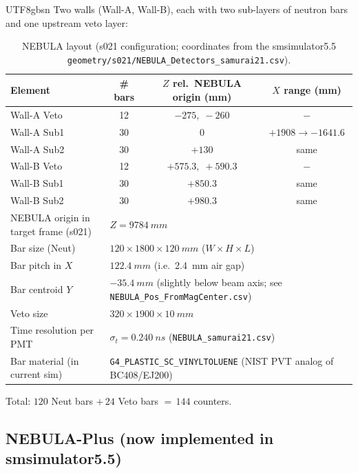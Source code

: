 \documentclass[11pt,a4paper]{article}
\newcommand{\NEB}{NEBULA}
\newcommand{\NPL}{NEBULA-Plus}
\begin{document}
\begin{CJK}{UTF8}{gbsn}
Two walls (Wall-A, Wall-B), each with two sub-layers of neutron bars
and one upstream veto layer:

\begin{table}[h]
\centering
\caption{\NEB{} layout (s021 configuration; coordinates from the smsimulator5.5
\texttt{geometry/s021/NEBULA\_Detectors\_samurai21.csv}).}
\begin{tabular}{lccc}
\toprule
Element & \# bars & $Z$ rel.\ \NEB{} origin (mm) & $X$ range (mm) \\
\midrule
Wall-A Veto    & 12 & $-275,\;-260$         & $-$ \\
Wall-A Sub1    & 30 & $0$                   & $+1908 \to -1641.6$\\
Wall-A Sub2    & 30 & $+130$                & same\\
Wall-B Veto    & 12 & $+575.3,\;+590.3$     & $-$\\
Wall-B Sub1    & 30 & $+850.3$              & same\\
Wall-B Sub2    & 30 & $+980.3$              & same\\
\midrule
\NEB{} origin in target frame (s021) & \multicolumn{3}{l}{$Z = \SI{9784}{mm}$}\\
Bar size (Neut)   & \multicolumn{3}{l}{$120 \times 1800 \times \SI{120}{mm}$ ($W\times H\times L$)}\\
Bar pitch in $X$  & \multicolumn{3}{l}{$\SI{122.4}{mm}$ (i.e.\ \SI{2.4}{mm} air gap)}\\
Bar centroid $Y$  & \multicolumn{3}{l}{$\SI{-35.4}{mm}$ (slightly below beam axis;
                       see \texttt{NEBULA\_Pos\_FromMagCenter.csv})}\\
Veto size         & \multicolumn{3}{l}{$320 \times 1900 \times \SI{10}{mm}$}\\
Time resolution per PMT & \multicolumn{3}{l}{$\sigma_t = \SI{0.240}{ns}$
                       (\texttt{NEBULA\_samurai21.csv})}\\
Bar material (in current sim) & \multicolumn{3}{l}{\texttt{G4\_PLASTIC\_SC\_VINYLTOLUENE}
                       (NIST PVT analog of BC408/EJ200)}\\
\bottomrule
\end{tabular}
\end{table}

Total: $120$ Neut bars $+\,24$ Veto bars $=\,144$ counters.

\subsection{\NPL{} (now implemented in smsimulator5.5)}
\label{sec:internal-npl}


\end{CJK}
\end{document}
